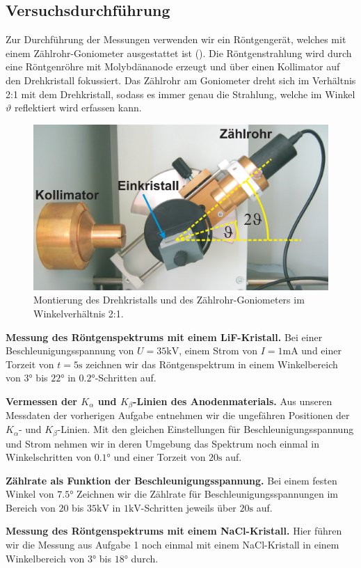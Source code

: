 \subsection{Versuchsdurchführung}

Zur Durchführung der Messungen verwenden wir ein Röntgengerät, welches mit einem Zählrohr-Goniometer ausgestattet ist (). Die Röntgenstrahlung wird durch eine Röntgenröhre mit Molybdänanode erzeugt und über einen Kollimator auf den Drehkristall fokussiert. Das Zählrohr am Goniometer dreht sich im Verhältnis 2:1 mit dem Drehkristall, sodass es immer genau die Strahlung, welche im Winkel $\vartheta$ reflektiert wird erfassen kann.

\begin{figure}[H]
  \centering
  \includegraphics[width=.8\textwidth]{files/goniometer.png}
  \caption{Montierung des Drehkristalls und des Zählrohr-Goniometers im Winkelverhältnis 2:1.}
  \label{fig:goniometer}
\end{figure}

\textbf{Messung des Röntgenspektrums mit einem LiF-Kristall.} Bei einer Beschleunigungsspannung von $U = 35 \si{\kilo\volt}$, einem Strom von $I = 1\si{\milli\ampere}$ und einer Torzeit von $t = 5\si{\second}$ zeichnen wir das Röntgenspektrum in einem Winkelbereich von $3\si{\degree}$ bis $22\si{\degree}$ in $0.2\si{\degree}$-Schritten auf.

\textbf{Vermessen der $K_{\alpha}$ und $K_{\beta}$-Linien des Anodenmaterials.} Aus unseren Messdaten der vorherigen Aufgabe entnehmen wir die ungefähren Positionen der $K_{\alpha}$- und $K_{\beta}$-Linien. Mit den gleichen Einstellungen für Beschleunigungsspannung und Strom nehmen wir in deren Umgebung das Spektrum noch einmal in Winkelschritten von $0.1\si{\degree}$ und einer Torzeit von $20 \si{\second}$ auf.

\textbf{Zählrate als Funktion der Beschleunigungsspannung.} Bei einem festen Winkel von $7.5\si{\degree}$ Zeichnen wir die Zählrate für Beschleunigungsspannungen im Bereich von $20$ bis $35\si{\kilo\volt}$ in $1\si{\kilo\volt}$-Schritten jeweils über $20\si{\second}$ auf.

\textbf{Messung des Röntgenspektrums mit einem NaCl-Kristall.} Hier führen wir die Messung aus Aufgabe 1 noch einmal mit einem NaCl-Kristall in einem Winkelbereich von $3\si{\degree}$ bis $18\si{\degree}$ durch.